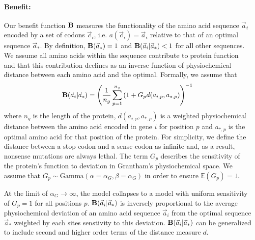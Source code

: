 \documentclass{article}
\newcommand{\EE}{\mathbb{E}} %
\newcommand{\Funcaoptvec}{\ensuremath{\Func(\aoptvec)}\xspace}
\newcommand{\Funcaveci}{\ensuremath{\Func(\aveci|\aoptvec)}\xspace}
\newcommand{\Func}{\ensuremath{\text{\textbf{B}}}\xspace}
\newcommand{\aip}{\ensuremath{a_{i,p}}\xspace}
\newcommand{\alphag}{\ensuremath{\alpha_G}\xspace}
\newcommand{\aoptp}{\ensuremath{a_{*,p}}\xspace}
\newcommand{\aoptvec}{\ensuremath{\Vec{a}_*}\xspace}
\newcommand{\aveci}{\ensuremath{\Vec{a}_i}\xspace}
\newcommand{\cveci}{\ensuremath{\cvec_i}\xspace}
\newcommand{\cvec}{\ensuremath{\Vec{c}}\xspace}
\renewcommand{\ng}{\ensuremath{{n_g}}\xspace}
\newcommand{\gp}{\ensuremath{{G_p}}\xspace}
\begin{document}
\paragraph*{Benefit: }
Our benefit function \Func measures the functionality of the amino acid sequence \aveci encoded by a set of codons \cveci, i.e. $a(\cveci) = \aveci$ relative to that of an optimal sequence $\aoptvec$.
By definition,  $\Funcaoptvec = 1$ and $\Funcaveci < 1$ for all other sequences.
We assume all amino acids within the sequence contribute to protein function and that this contribution declines as an inverse function of physiochemical distance between each amino acid and the optimal.
Formally, we assume that
\begin{equation}
\Funcaveci = \left(\frac{1}{\ng} \sum_{p=1}^\ng \left(1 + \gp d(\aip, \aoptp\right)\right)^{-1}
\end{equation}
where $\ng$ is the length of the protein, $d(\aip, \aoptp)$ is a weighted physiochemical distance between the amino acid encoded in gene $i$ for position $p$ and $\aoptp$ is the optimal amino acid for that position of the protein.
For simplicity, we define the distance between a stop codon and a sense codon as infinite and, as a result, nonsense mutations are always lethal.
The term \gp describes the sensitivity of the protein's function to deviation in Grantham's physiochemical space.
We assume that  $\gp \sim \text{Gamma}\left(\alpha = \alphag, \beta = \alphag\right)$ in order to ensure $\EE(\gp) = 1$.

At the limit of $\alphag \rightarrow \infty$, the model collapses to a model with uniform sensitivity of $\gp = 1$ for all positions $p$.
\Funcaveci is inversely proportional to the average physiochemical deviation of an amino acid sequence \aveci from the optimal sequence \aoptvec weighted by each sites senstivity to this deviation.
\Funcaveci can be generalized to include second and higher order terms of the distance measure $d$.
\end{document}
